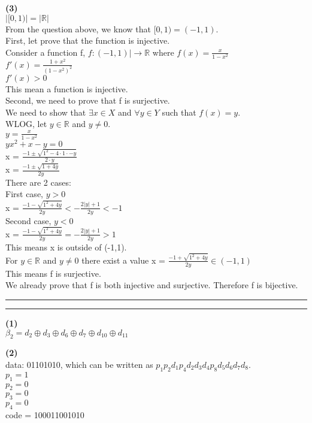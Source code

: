 \documentclass[a4paper, 11pt]{article}
\newcommand{\question}[2] {\vspace{.25in} \hrule\vspace{0.5em}
\noindent{\bf #1: #2} \vspace{0.5em}
\hrule \vspace{.10in}}
\renewcommand{\part}[1] {\vspace{.10in} {\bf (#1)}}
\begin{document}
\part{3}\\
$|[0,1)| = |\mathbb{R}|$\\
From the question above, we know that $[0,1) = (-1,1)$.\\
First, let prove that the function is injective.\\
Consider a function f, $f:(-1,1)|\rightarrow \mathbb{R}$ where $f(x) = \frac{x}{1-x^2}$\\
$f'(x) = \frac{1+x^2}{(1-x^2)^2}$\\
$f'(x) > 0$\\
This mean a function is injective.\\
Second, we need to prove that f is surjective.\\
We need to show that $\exists x \in X$ and $\forall y \in Y$ such that $f(x) = y$.\\
WLOG, let $y \in \mathbb{R}$ and $y \neq 0$.\\
$y = \frac{x}{1-x^2}$\\
$yx^2+x-y=0$\\
x = $\frac{-1 \pm \sqrt{1^2 - 4 \cdot 1 \cdot -y}}{2 \cdot y}$\\
x = $\frac{-1 \pm \sqrt{1 + 4y}}{2y}$\\
There are 2 cases:\\
First case, $y>0$\\
x = $\frac{-1 - \sqrt{1^2 + 4y}}{2y} < -\frac{2|y|+1}{2y} < -1$\\
Second case, $y<0$\\
x = $\frac{-1 - \sqrt{1^2 + 4y}}{2y} = -\frac{2|y|+1}{2y} > 1$\\
This means x is outside of (-1,1).\\
For $y \in \mathbb{R}$ and $y \neq 0$ there exist a value x = $\frac{-1 + \sqrt{1^2 + 4y}}{2y} \in (-1,1)$\\
This means f is surjective.\\
We already prove that f is both injective and surjective. Therefore f is bijective.

\question{3}{Hamming Code}
\part{1}\\
$\beta_2 = d_2 \oplus d_3 \oplus d_6 \oplus d_7 \oplus d_10 \oplus d_11$

\part{2}\\
data: 01101010, which can be written as $p_1 p_2 d_1 p_4 d_2 d_3 d_4 p_8 d_5 d_6 d_7 d_8$.\\
$p_1 = 1$\\
$p_2 = 0$\\
$p_3 = 0$\\
$p_4 = 0$\\
code = 100011001010
\end{document}
